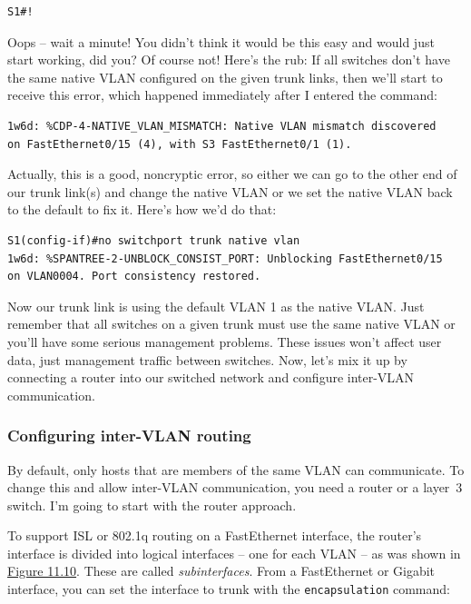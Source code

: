 \begin{verbatim}
S1#!
\end{verbatim}

Oops -- wait a minute! You didn't think it would be this easy and would
just start working, did you? Of course not! Here's the rub: If all
switches don't have the same native VLAN configured on the given trunk
links, then we'll start to receive this error, which happened
immediately after I entered the command:

\begin{verbatim}
1w6d: %CDP-4-NATIVE_VLAN_MISMATCH: Native VLAN mismatch discovered
on FastEthernet0/15 (4), with S3 FastEthernet0/1 (1).
\end{verbatim}

Actually, this is a good, noncryptic error, so either we can go to the
other end of our trunk link(s) and change the native VLAN or we set the
native VLAN back to the default to fix it. Here's how we'd do that:

\begin{verbatim}
S1(config-if)#no switchport trunk native vlan
1w6d: %SPANTREE-2-UNBLOCK_CONSIST_PORT: Unblocking FastEthernet0/15
on VLAN0004. Port consistency restored.
\end{verbatim}

Now our trunk link is
using the default VLAN 1 as the native VLAN. Just remember that all
switches on a given trunk must use the same native VLAN or you'll have
some serious management problems. These issues won't affect user data,
just management traffic between switches. Now, let's mix it up by
connecting a router into our switched network and configure inter-VLAN
communication.

\subsubsection{Configuring inter-VLAN routing}

By default, only hosts that are members of the same VLAN can
communicate. To change this and allow inter-VLAN communication, you need
a router or a layer~3 switch. I'm going to start with the router
approach.

To support ISL or 802.1q routing on a FastEthernet interface, the
router's interface is divided into logical interfaces -- one for each
VLAN -- as was shown in
\protect\hyperlink{c11.xhtmlux5cux23figure11-10}{Figure 11.10}. These
are called \emph{subinterfaces}. From a FastEthernet or Gigabit
interface, you can set the interface to trunk with the
\texttt{encapsulation} command:

